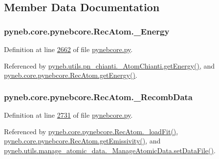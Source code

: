 \subsection{Member Data Documentation}
\hypertarget{classpyneb_1_1core_1_1pynebcore_1_1_rec_atom_a652daa9311973780fd44f61e09bc650f}{
\subsubsection[{\-\_\-\-Energy}]{\setlength{\rightskip}{0pt plus 5cm}pyneb.\-core.\-pynebcore.\-Rec\-Atom.\-\_\-\-Energy\hspace{0.3cm}{\ttfamily [private]}}}\label{classpyneb_1_1core_1_1pynebcore_1_1_rec_atom_a652daa9311973780fd44f61e09bc650f}


Definition at line \hyperlink{pynebcore_8py_source_l02662}{2662} of file \hyperlink{pynebcore_8py_source}{pynebcore.\-py}.



Referenced by \hyperlink{pn__chianti_8py_source_l00366}{pyneb.\-utils.\-pn\-\_\-chianti.\-\_\-\-Atom\-Chianti.\-get\-Energy()}, and \hyperlink{pynebcore_8py_source_l02927}{pyneb.\-core.\-pynebcore.\-Rec\-Atom.\-get\-Energy()}.

\hypertarget{classpyneb_1_1core_1_1pynebcore_1_1_rec_atom_a1f483d9d99af479ef137489ccefe35e9}{
\subsubsection[{\-\_\-\-Recomb\-Data}]{\setlength{\rightskip}{0pt plus 5cm}pyneb.\-core.\-pynebcore.\-Rec\-Atom.\-\_\-\-Recomb\-Data\hspace{0.3cm}{\ttfamily [private]}}}\label{classpyneb_1_1core_1_1pynebcore_1_1_rec_atom_a1f483d9d99af479ef137489ccefe35e9}


Definition at line \hyperlink{pynebcore_8py_source_l02731}{2731} of file \hyperlink{pynebcore_8py_source}{pynebcore.\-py}.



Referenced by \hyperlink{pynebcore_8py_source_l02754}{pyneb.\-core.\-pynebcore.\-Rec\-Atom.\-\_\-load\-Fit()}, \hyperlink{pynebcore_8py_source_l02990}{pyneb.\-core.\-pynebcore.\-Rec\-Atom.\-get\-Emissivity()}, and \hyperlink{manage__atomic__data_8py_source_l00380}{pyneb.\-utils.\-manage\-\_\-atomic\-\_\-data.\-\_\-\-Manage\-Atomic\-Data.\-set\-Data\-File()}.

